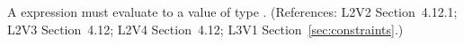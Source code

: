 A \Constraint {} expression must evaluate to a value of type
.  (References: L2V2 Section~4.12.1; L2V3
Section~4.12; L2V4 Section~4.12; L3V1 Section~\ref{sec:constraints}.)
